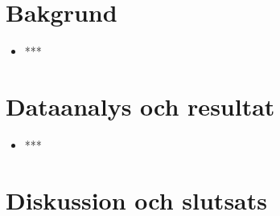 \section{Bakgrund}

\begin{itemize}
    \item ***
\end{itemize}

\section{Dataanalys och resultat}

\begin{itemize}
    \item ***
\end{itemize}

\section{Diskussion och slutsats}